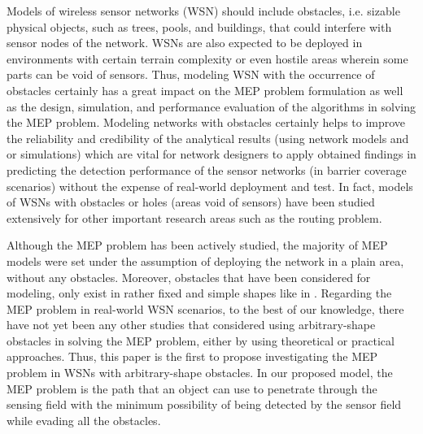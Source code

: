 \documentclass[final]{elsarticle}
\begin{document}
Models of wireless sensor networks (WSN) should include obstacles, i.e. sizable physical objects, such as trees, pools, and buildings, that could interfere
with sensor nodes of the network. WSNs are also expected to be deployed in
environments with certain terrain complexity or even hostile areas wherein some
parts can be void of sensors. Thus, modeling WSN with the occurrence of obstacles certainly has a great impact on the MEP problem formulation as well as the
design, simulation, and performance evaluation of the algorithms in solving the
MEP problem. Modeling networks with obstacles certainly helps to improve the
reliability and credibility of the analytical results (using network models and or
simulations) which are vital for network designers to apply obtained findings in
predicting the detection performance of the sensor networks (in barrier coverage
scenarios) without the expense of real-world deployment and test. In fact, models of WSNs with obstacles or holes (areas void of sensors) have been studied
extensively for other important research areas such as the routing problem.

Although the MEP problem has been actively studied, the majority of MEP models were set under the assumption of deploying the network in a plain area, without any obstacles. Moreover, obstacles that have been considered for modeling, only exist in rather fixed and simple shapes like in \cite{liu2017obstacle}. Regarding the MEP problem in real-world WSN scenarios, to the best of our knowledge, there have not yet been any other studies that considered using arbitrary-shape obstacles in solving the MEP problem, either by using theoretical or practical approaches. Thus, this paper is the first to propose investigating the MEP problem in WSNs with arbitrary-shape obstacles. In our proposed model, the MEP problem is the path that an object can use to penetrate through the sensing field with the minimum possibility of being detected by the sensor field while evading all the obstacles. 
\end{document}
